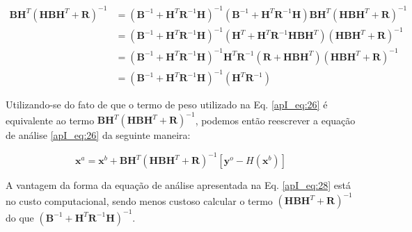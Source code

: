 


\begin{equation}
  \label{apI_eq:27}
  \begin{aligned}
     \mathbf{B}\mathbf{H}^{T}(\mathbf{H}\mathbf{B}\mathbf{H}^{T}+\mathbf{R})^{-1} & = (\mathbf{B}^{-1}+\mathbf{H}^{T}\mathbf{R}^{-1}\mathbf{H})^{-1} (\mathbf{B}^{-1}+\mathbf{H}^{T}\mathbf{R}^{-1}\mathbf{H})\mathbf{B}\mathbf{H}^{T} (\mathbf{H}\mathbf{B}\mathbf{H}^{T}+\mathbf{R})^{-1} \\
                & = (\mathbf{B}^{-1}+\mathbf{H}^{T}\mathbf{R}^{-1}\mathbf{H})^{-1} (\mathbf{H}^{T}+\mathbf{H}^{T}\mathbf{R}^{-1}\mathbf{H}\mathbf{B}\mathbf{H}^{T}) (\mathbf{H}\mathbf{B}\mathbf{H}^{T}+\mathbf{R})^{-1} \\ 
                & = (\mathbf{B}^{-1}+\mathbf{H}^{T}\mathbf{R}^{-1}\mathbf{H})^{-1} \mathbf{H}^{T}\mathbf{R}^{-1}(\mathbf{R}+\mathbf{H}\mathbf{B}\mathbf{H}^{T}) (\mathbf{H}\mathbf{B}\mathbf{H}^{T}+\mathbf{R})^{-1} \\
                & = (\mathbf{B}^{-1} + \mathbf{H}^{T}\mathbf{R}^{-1}\mathbf{H})^{-1}{(\mathbf{H}^{T}\mathbf{R}^{-1})}
  \end{aligned}  
\end{equation}

Utilizando-se do fato de que o termo de peso utilizado na Eq. \ref{apI_eq:26} é equivalente ao termo $\mathbf{B}\mathbf{H}^{T}(\mathbf{H}\mathbf{B}\mathbf{H}^{T}+\mathbf{R})^{-1}$, podemos então reescrever a equação de análise \ref{apI_eq:26} da seguinte maneira:

\begin{equation}
  \label{apI_eq:28}
    \mathbf{x}^{a} = \mathbf{x}^{b} + \mathbf{B}\mathbf{H}^{T}(\mathbf{H}\mathbf{B}\mathbf{H}^{T}+\mathbf{R})^{-1} [\mathbf{y}^{o} - \textit{H}(\mathbf{x}^{b})]
\end{equation}

A vantagem da forma da equação de análise apresentada na Eq. \ref{apI_eq:28} está no custo computacional, sendo menos custoso calcular o termo $(\mathbf{H}\mathbf{B}\mathbf{H}^{T}+\mathbf{R})^{-1}$ do que $(\mathbf{B}^{-1} + \mathbf{H}^{T}\mathbf{R}^{-1}\mathbf{H})^{-1}$.